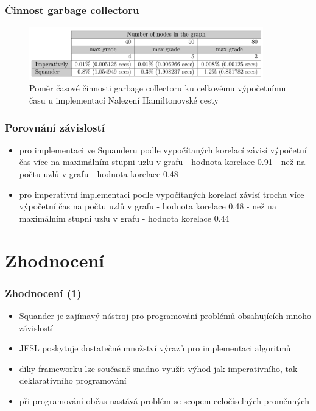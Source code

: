 \documentclass[czech]{beamer}
\begin{document}
\begin{frame}
\frametitle{Činnost garbage collectoru}
\begin{figure}[h]
	\begin{center}
	
   	\includegraphics[width=4in]{img/gc-activity} 
   \end{center}
   \caption{\tiny Poměr časové činnosti garbage collectoru ku celkovému
	výpočetnímu času u implementací Nalezení Hamiltonovské cesty}
 \end{figure}
\end{frame}

\begin{frame}
\frametitle{Porovnání závislostí}
\begin{itemize}
  \item<1-> pro implementaci ve Squanderu podle vypočítaných korelací závisí
  výpočetní čas více na maximálním stupni uzlu v grafu - hodnota korelace 0.91 -
  než na počtu uzlů v grafu - hodnota korelace 0.48
  \item<2-> pro imperativní implementaci podle vypočítaných
  korelací závisí trochu více výpočetní čas na počtu uzlů v grafu - hodnota
  korelace 0.48 - než na maximálním stupni uzlu v grafu - hodnota korelace 0.44
  \end{itemize}
\end{frame}

\section{Zhodnocení}

\begin{frame}
  \frametitle{Zhodnocení (1)}
  \begin{itemize}
  \item<1-> Squander je zajímavý nástroj pro programování problémů obsahujících
  mnoho závislostí
  \item<2-> JFSL poskytuje dostatečné množství výrazů pro implementaci algoritmů
  \item<3-> díky frameworku lze současně snadno využít výhod jak imperativního,
  tak deklarativního programování
  \item<4-> při programování občas nastává problém se scopem celočíselných
  proměnných
  \end{itemize}
\end{frame}
\end{document}
